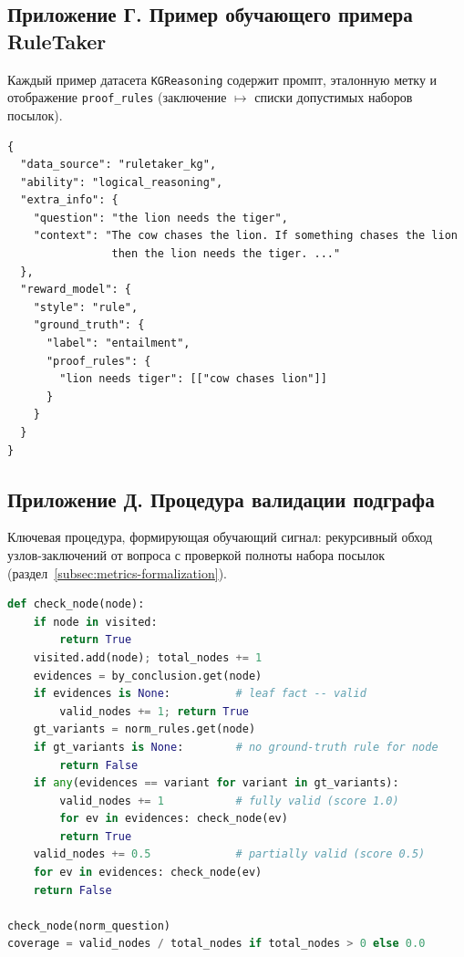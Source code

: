 \subsection*{Приложение Г. Пример обучающего примера RuleTaker}

Каждый пример датасета \texttt{KGReasoning} содержит промпт, эталонную метку и отображение \texttt{proof\_rules} (заключение $\mapsto$ списки допустимых наборов посылок).

\begin{lstlisting}[basicstyle=\footnotesize\ttfamily]
{
  "data_source": "ruletaker_kg",
  "ability": "logical_reasoning",
  "extra_info": {
    "question": "the lion needs the tiger",
    "context": "The cow chases the lion. If something chases the lion
                then the lion needs the tiger. ..."
  },
  "reward_model": {
    "style": "rule",
    "ground_truth": {
      "label": "entailment",
      "proof_rules": {
        "lion needs tiger": [["cow chases lion"]]
      }
    }
  }
}
\end{lstlisting}

\subsection*{Приложение Д. Процедура валидации подграфа}

Ключевая процедура, формирующая обучающий сигнал: рекурсивный обход узлов-заключений от вопроса с проверкой полноты набора посылок (раздел~\ref{subsec:metrics-formalization}).

\begin{lstlisting}[language=Python, basicstyle=\footnotesize\ttfamily]
def check_node(node):
    if node in visited:
        return True
    visited.add(node); total_nodes += 1
    evidences = by_conclusion.get(node)
    if evidences is None:          # leaf fact -- valid
        valid_nodes += 1; return True
    gt_variants = norm_rules.get(node)
    if gt_variants is None:        # no ground-truth rule for node
        return False
    if any(evidences == variant for variant in gt_variants):
        valid_nodes += 1           # fully valid (score 1.0)
        for ev in evidences: check_node(ev)
        return True
    valid_nodes += 0.5             # partially valid (score 0.5)
    for ev in evidences: check_node(ev)
    return False

check_node(norm_question)
coverage = valid_nodes / total_nodes if total_nodes > 0 else 0.0
\end{lstlisting}

